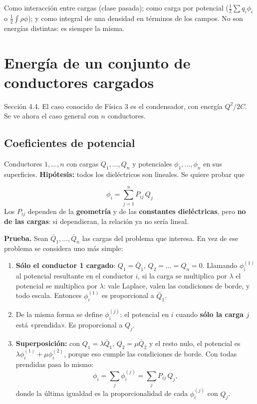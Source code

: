 \documentclass[12pt,a4paper]{article}
\begin{document}
\begin{notebox}
Como interacción entre cargas (clase pasada); como carga por potencial
($\tfrac12\sum q_i\phi_i$ o $\tfrac12\int\rho\phi$); y como integral de una
densidad en términos de los campos. No son energías distintas: es siempre la
misma.
\end{notebox}

\section{Energía de un conjunto de conductores cargados}

Sección 4.4. El caso conocido de Física 3 es el condensador, con energía
$Q^2/2C$. Se ve ahora el caso general con $n$ conductores.

\subsection{Coeficientes de potencial}

Conductores $1,\dots,n$ con cargas $Q_1,\dots,Q_n$ y potenciales
$\phi_1,\dots,\phi_n$ en sus superficies. \textbf{Hipótesis:} todos los
dieléctricos son lineales. Se quiere probar que

\begin{keybox}
\[
\boxed{\ \phi_i = \sum_{j=1}^{n} P_{ij}\,Q_j\ }
\]
Los $P_{ij}$ dependen de la \textbf{geometría} y de las \textbf{constantes
dieléctricas}, pero \textbf{no de las cargas}: si dependieran, la relación ya no
sería lineal.
\end{keybox}

\textbf{Prueba.} Sean $\bar Q_1,\dots,\bar Q_n$ las cargas del problema que
interesa. En vez de ese problema se considera uno más simple:
\begin{enumerate}
  \item \textbf{Sólo el conductor 1 cargado}: $Q_1 = \bar Q_1$,
    $Q_2=\dots=Q_n=0$. Llamando $\phi_i^{(1)}$ al potencial resultante en el
    conductor $i$, si la carga se multiplica por $\lambda$ el potencial se
    multiplica por $\lambda$: vale Laplace, valen las condiciones de borde, y todo
    escala. Entonces $\phi_i^{(1)}$ es proporcional a $\bar Q_1$.
  \item De la misma forma se define $\phi_i^{(j)}$: el potencial en $i$ cuando
    \textbf{sólo la carga $j$} está «prendida». Es proporcional a $Q_j$.
  \item \textbf{Superposición:} con $Q_1 = \lambda\bar Q_1$, $Q_2 = \mu\bar Q_2$
    y el resto nulo, el potencial es $\lambda\phi_i^{(1)} + \mu\phi_i^{(2)}$,
    porque eso cumple las condiciones de borde. Con todas prendidas pasa lo mismo:
    \[
    \phi_i = \sum_j \phi_i^{(j)} = \sum_j P_{ij}\,Q_j ,
    \]
    donde la última igualdad es la proporcionalidad de cada $\phi_i^{(j)}$ con
    $Q_j$.
\end{enumerate}
\end{document}
